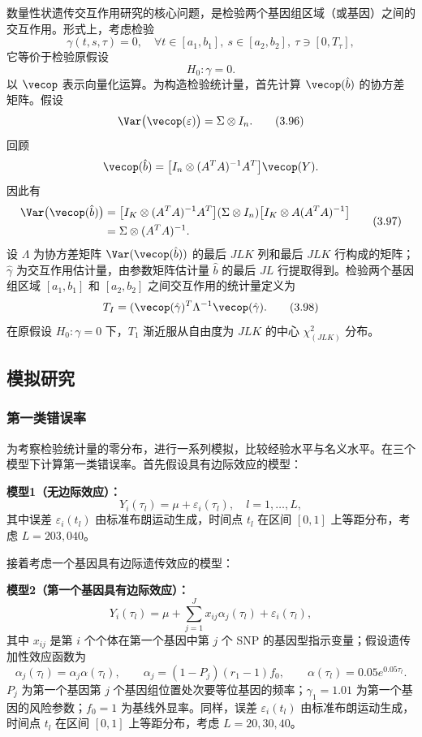 数量性状遗传交互作用研究的核心问题，是检验两个基因组区域（或基因）之间的交互作用。形式上，考虑检验
\[
\gamma(t,s,\tau)=0,\quad \forall t\in[a_1,b_1],\ s\in[a_2,b_2],\ \tau\ni[0,T_\tau],
\]
它等价于检验原假设
\begin{equation}
H_0:\gamma=0.
\tag{3.95}
\end{equation}
以 $\vecop$ 表示向量化运算。为构造检验统计量，首先计算 $\vecop(\hat b)$ 的协方差矩阵。假设
\begin{equation}
\Var\bigl(\vecop(\varepsilon)\bigr)=\Sigma\otimes I_n.
\tag{3.96}
\end{equation}
回顾
\[
\vecop(\hat b)=\bigl[I_n\otimes(A^TA)^{-1}A^T\bigr]\vecop(Y).
\]
因此有
\begin{equation}
\begin{aligned}
\Var\bigl(\vecop(\hat b)\bigr)
&=\bigl[I_K\otimes(A^TA)^{-1}A^T\bigr](\Sigma\otimes I_n)
\bigl[I_K\otimes A(A^TA)^{-1}\bigr]\\
&=\Sigma\otimes(A^TA)^{-1}.
\end{aligned}
\tag{3.97}
\end{equation}
设 $\Lambda$ 为协方差矩阵 $\Var(\vecop(\hat b))$ 的最后 $JLK$ 列和最后 $JLK$ 行构成的矩阵；$\hat\gamma$ 为交互作用估计量，由参数矩阵估计量 $\hat b$ 的最后 $JL$ 行提取得到。检验两个基因组区域 $[a_1,b_1]$ 和 $[a_2,b_2]$ 之间交互作用的统计量定义为
\begin{equation}
T_I=(\vecop(\hat\gamma)^T\Lambda^{-1}\vecop(\hat\gamma).
\tag{3.98}
\end{equation}
在原假设 $H_0:\gamma=0$ 下，$T_1$ 渐近服从自由度为 $JLK$ 的中心 $\chi^2_{(JLK)}$ 分布。

\subsection{模拟研究}
\subsubsection{第一类错误率}

为考察检验统计量的零分布，进行一系列模拟，比较经验水平与名义水平。在三个模型下计算第一类错误率。首先假设具有边际效应的模型：

\textbf{模型1（无边际效应）：}
\[
Y_i(\tau_l)=\mu+\varepsilon_i(\tau_l),\quad l=1,\ldots,L,
\]
其中误差 $\varepsilon_i(t_l)$ 由标准布朗运动生成，时间点 $t_l$ 在区间 $[0,1]$ 上等距分布，考虑 $L=203,040$。

接着考虑一个基因具有边际遗传效应的模型：

\textbf{模型2（第一个基因具有边际效应）：}
\[
Y_i(\tau_l)=\mu+\sum_{j=1}^{J}x_{ij}\alpha_j(\tau_l)+\varepsilon_i(\tau_l),
\]
其中 $x_{ij}$ 是第 $i$ 个个体在第一个基因中第 $j$ 个 SNP 的基因型指示变量；假设遗传加性效应函数为
\[
\alpha_j(\tau_l)=\alpha_j\alpha(\tau_l),\qquad
\alpha_j=(1-P_j)(r_1-1)f_0,\qquad
\alpha(\tau_l)=0.05e^{0.05\tau_l}.
\]
$P_j$ 为第一个基因第 $j$ 个基因组位置处次要等位基因的频率；$\gamma_1=1.01$ 为第一个基因的风险参数；$f_0=1$ 为基线外显率。同样，误差 $\varepsilon_i(t_l)$ 由标准布朗运动生成，时间点 $t_l$ 在区间 $[0,1]$ 上等距分布，考虑 $L=20,30,40$。


